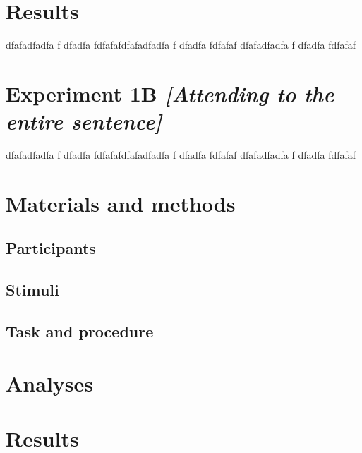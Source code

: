 \documentclass[a4paper, nobind]{templates/ociamthesis}
\begin{document}
\hypertarget{results}{%
\section{Results}\label{results}}

dfafadfadfa f
dfadfa
fdfafafdfafadfadfa f
dfadfa
fdfafaf
dfafadfadfa f
dfadfa
fdfafaf

\hypertarget{experiment-1b-attending-to-the-entire-sentence}{%
\section{\texorpdfstring{Experiment 1B \emph{{[}Attending to the entire sentence{]}}}{Experiment 1B {[}Attending to the entire sentence{]}}}\label{experiment-1b-attending-to-the-entire-sentence}}

dfafadfadfa f
dfadfa
fdfafafdfafadfadfa f
dfadfa
fdfafaf
dfafadfadfa f
dfadfa
fdfafaf

\hypertarget{materials-and-methods-1}{%
\section{Materials and methods}\label{materials-and-methods-1}}

\hypertarget{participants-1}{%
\subsection{Participants}\label{participants-1}}

\hypertarget{stimuli-1}{%
\subsection{Stimuli}\label{stimuli-1}}

\hypertarget{task-and-procedure-1}{%
\subsection{Task and procedure}\label{task-and-procedure-1}}

\hypertarget{analyses-1}{%
\section{Analyses}\label{analyses-1}}

\hypertarget{results-1}{%
\section{Results}\label{results-1}}
\end{document}
